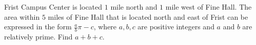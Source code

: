 Frist Campus Center is located $1$ mile north and $1$ mile west of Fine Hall. The area within $5$ miles of Fine Hall that is located north and east of Frist can be expressed in the form $\frac{a}{b} \pi - c$,  where $a, b, c$ are positive integers and $a$ and $b$ are relatively prime. Find $a + b + c$.